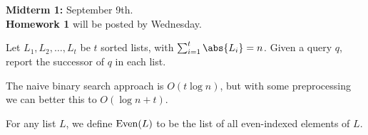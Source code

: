 
\textbf{Midterm 1:} September 9th. \\
\textbf{Homework 1} will be posted by Wednesday.

\begin{question*}
    Let $L_1, L_2, \dots, L_t$ be $t$ sorted lists, with
    $\sum_{i=1}^t \abs{L_i} = n$.
    Given a query $q$, report the successor of $q$ in each list.
\end{question*}
The naive binary search approach is $O(t \log n)$, but with
some preprocessing we can better this to $O(\log n + t)$.

\begin{definition}
    For any list $L$, we define $\operatorname{Even}(L)$
    to be the list of all even-indexed elements of $L$.
\end{definition}

